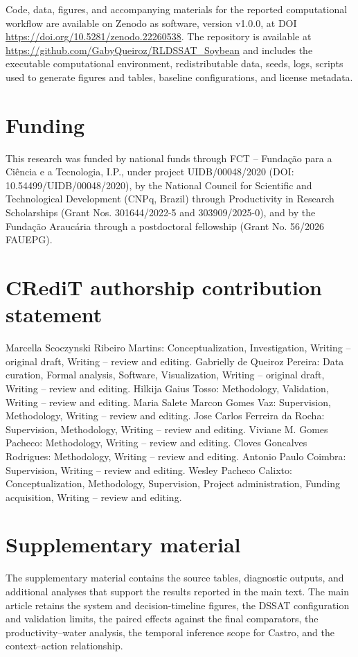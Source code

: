 \documentclass[times,final,authoryear]{elsarticle}
\begin{document}
Code, data, figures, and accompanying materials for the reported computational workflow are available on Zenodo as software, version v1.0.0, at DOI \url{https://doi.org/10.5281/zenodo.22260538}. The repository is available at \url{https://github.com/GabyQueiroz/RLDSSAT_Soybean} and includes the executable computational environment, redistributable data, seeds, logs, scripts used to generate figures and tables, baseline configurations, and license metadata.

\section*{Funding}
This research was funded by national funds through FCT – Fundação para a Ciência e a Tecnologia, I.P., under project UIDB/00048/2020 (DOI: 10.54499/UIDB/00048/2020), by the National Council for Scientific and Technological Development (CNPq, Brazil) through Productivity in Research Scholarships (Grant Nos. 301644/2022-5 and 303909/2025-0), and by the Fundação Araucária through a postdoctoral fellowship (Grant No. 56/2026 FAUEPG).

\section*{CRediT authorship contribution statement}

Marcella Scoczynski Ribeiro Martins: Conceptualization, Investigation, Writing -- original draft, Writing -- review and editing. Gabrielly de Queiroz Pereira: Data curation, Formal analysis, Software, Visualization, Writing -- original draft, Writing -- review and editing. Hilkija Gaius Tosso: Methodology, Validation, Writing -- review and editing. Maria Salete Marcon Gomes Vaz: Supervision, Methodology, Writing -- review and editing. Jose Carlos Ferreira da Rocha: Supervision, Methodology, Writing -- review and editing. Viviane M. Gomes Pacheco: Methodology, Writing -- review and editing. Cloves Goncalves Rodrigues: Methodology, Writing -- review and editing. Antonio Paulo Coimbra: Supervision, Writing -- review and editing. Wesley Pacheco Calixto: Conceptualization, Methodology, Supervision, Project administration, Funding acquisition, Writing -- review and editing.

\section*{Supplementary material}

The supplementary material contains the source tables, diagnostic outputs, and additional analyses that support the results reported in the main text. The main article retains the system and decision-timeline figures, the DSSAT configuration and validation limits, the paired effects against the final comparators, the productivity--water analysis, the temporal inference scope for Castro, and the context--action relationship.
\end{document}
